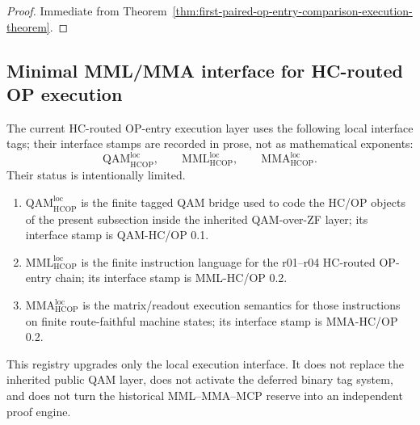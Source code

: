 \begin{proof}
Immediate from Theorem~\ref{thm:first-paired-op-entry-comparison-execution-theorem}.
\end{proof}



\subsection{Minimal MML/MMA interface for HC-routed OP execution}
\label{subsec:minimal-mml-mma-interface-hc-routed-op-execution}

\begin{definition}
\label{def:r07-local-language-version-registry}
The current HC-routed OP-entry execution layer uses the following local interface tags; their interface stamps are recorded in prose, not as mathematical exponents:
\[
  \mathrm{QAM}_{\mathrm{HCOP}}^{\mathrm{loc}},
  \qquad
  \mathrm{MML}_{\mathrm{HCOP}}^{\mathrm{loc}},
  \qquad
  \mathrm{MMA}_{\mathrm{HCOP}}^{\mathrm{loc}}.
\]
Their status is intentionally limited.
\begin{enumerate}[leftmargin=2em,label=(\alph*)]
  \item \(\mathrm{QAM}_{\mathrm{HCOP}}^{\mathrm{loc}}\) is the finite tagged QAM bridge used to code the HC/OP objects of the present subsection inside the inherited QAM-over-ZF layer; its interface stamp is QAM-HC/OP 0.1.
  \item \(\mathrm{MML}_{\mathrm{HCOP}}^{\mathrm{loc}}\) is the finite instruction language for the r01--r04 HC-routed OP-entry chain; its interface stamp is MML-HC/OP 0.2.
  \item \(\mathrm{MMA}_{\mathrm{HCOP}}^{\mathrm{loc}}\) is the matrix/readout execution semantics for those instructions on finite route-faithful machine states; its interface stamp is MMA-HC/OP 0.2.
\end{enumerate}
This registry upgrades only the local execution interface. It does not replace the inherited public QAM layer, does not activate the deferred binary tag system, and does not turn the historical MML--MMA--MCP reserve into an independent proof engine.
\end{definition}

